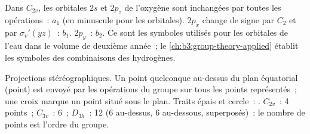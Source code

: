 \begin{example}\label{ex:b3:point-groups:water-orbitals}
Dans $C_{2v}$, les orbitales $2s$ et $2p_z$ de l'oxygène sont inchangées
par toutes les opérations~: $a_1$ (en minuscule pour les orbitales).
$2p_x$ change de signe par $C_2$ et par
$\sigma_v'(yz)$~: $b_1$. $2p_y$~: $b_2$. Ce sont les symboles utilisés
pour les orbitales de l'eau dans le volume de deuxième année~; le
\cref{ch:b3:group-theory-applied} établit les symboles des combinaisons
des hydrogènes.
\end{example}

\begin{omfigure}

{\small Projections stéréographiques. Un point quelconque au-dessus du
plan équatorial (point) est envoyé par les opérations du groupe sur tous
les points représentés~; une croix marque un point situé sous le plan.
Traits épais et cercle~: . $C_{2v}$~: 4 points~;
$C_{3v}$~: 6~; $D_{3h}$~: 12 (6 au-dessus, 6 au-dessous, superposés)~:
le nombre de points est l'ordre du groupe.}
\end{omfigure}

